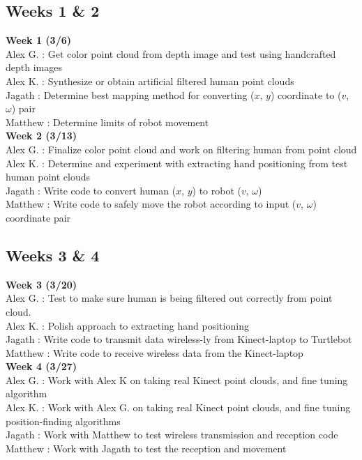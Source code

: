 \documentclass[a4paper]{article}
\begin{document}
\subsection{Weeks 1 \& 2}

\textbf{Week 1 (3/6)} \\
Alex G. : Get color point cloud from depth image and test using handcrafted depth images\\
Alex K. : Synthesize or obtain artificial filtered human point clouds\\
Jagath : Determine best mapping method for converting ($x$, $y$) coordinate to ($v$, $\omega$) pair \\
Matthew : Determine limits of robot movement \\
\textbf{Week 2 (3/13)} \\
Alex G. : Finalize color point cloud and work on filtering human from point cloud \\
Alex K. : Determine and experiment with extracting hand positioning from test human point clouds\\
Jagath : Write code to convert human ($x$, $y$) to robot ($v$, $\omega$) \\
Matthew :  Write code to safely move the robot according to input ($v$, $\omega$) coordinate pair \\

\subsection{Weeks 3 \& 4}
\textbf{Week 3 (3/20)} \\
Alex G. : Test to make sure human is being filtered out correctly from point cloud.\\
Alex K. : Polish approach to extracting hand positioning\\
Jagath : Write code to transmit data wireless-ly from Kinect-laptop to Turtlebot\\
Matthew : Write code to receive wireless data from the Kinect-laptop \\
\textbf{Week 4 (3/27)} \\
Alex G. : Work with Alex K on taking real Kinect point clouds, and fine tuning algorithm \\
Alex K. : Work with Alex G. on taking real Kinect point clouds, and fine tuning position-finding algorithms\\
Jagath : Work with Matthew to test wireless transmission and reception code\\
Matthew :  Work with Jagath to test the reception and movement \\
\end{document}
